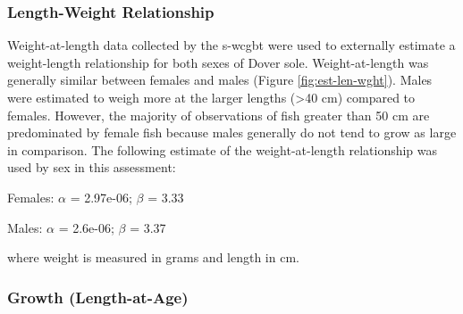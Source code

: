 \documentclass[11pt,
  english,
  a4paper,
]{article}
\begin{document}
\leavevmode\tagmcend\tagstructend\par


\hypertarget{length-weight-relationship}{%
\subsubsection{Length-Weight Relationship}\label{length-weight-relationship}}

\leavevmode\tagmcend\tagstructend


Weight-at-length data collected by the \gls{s-wcgbt} were used to externally estimate a weight-length relationship for both sexes of Dover sole. Weight-at-length was generally similar between females and males (Figure \ref{fig:est-len-wght}). Males were estimated to weigh more at the larger lengths (\textgreater40 cm) compared to females. However, the majority of observations of fish greater than 50 cm are predominated by female fish because males generally do not tend to grow as large in comparison. The following estimate of the weight-at-length relationship was used by sex in this assessment:

\leavevmode\tagmcend\tagstructend\par

\begin{centering}

Females: $\alpha$ = 2.97e-06; $\beta$ = 3.33

Males: $\alpha$ = 2.6e-06; $\beta$ = 3.37

\end{centering}

\vspace{0.50cm}


where weight is measured in grams and length in cm.

\leavevmode\tagmcend\tagstructend\par


\hypertarget{growth-length-at-age}{%
\subsubsection{Growth (Length-at-Age)}\label{growth-length-at-age}}

\leavevmode\tagmcend\tagstructend
\end{document}
